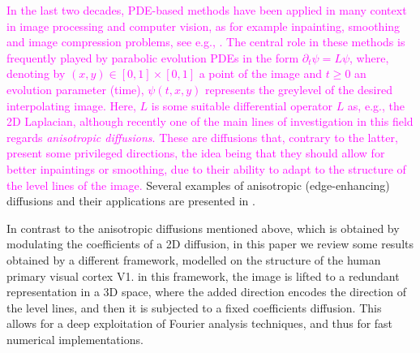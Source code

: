 \documentclass[proc]{edpsmath}
\begin{document}
\textcolor{magenta}{
In the last two decades, PDE-based methods have been applied in many context in image processing and computer vision, as for example inpainting, smoothing and image compression problems, see e.g., \cite{GWWBBS,Tschum,Weickert}. The central role in these methods is frequently played by parabolic evolution PDEs in the form $\partial_t \psi = L\psi$, where, denoting by $(x,y)\in[0,1]\times[0,1]$ a point of the image and $t \ge 0$ an evolution parameter (time), $\psi(t,x,y)$ represents the greylevel of the desired interpolating image. Here, $L$ is some suitable differential operator $L$  as, e.g., the 2D Laplacian, although recently one of the main lines of investigation in this field regards \emph{anisotropic diffusions}. These are diffusions that, contrary to the latter, 
present some privileged directions, the idea being that they should allow for better inpaintings or smoothing, due to their ability to adapt to the structure of the level lines
of the image.
}
Several examples of anisotropic (edge-enhancing) diffusions and their applications
are presented in \cite{GWWBBS,Tschum}.

In contrast to the anisotropic diffusions mentioned above, which is obtained by modulating the coefficients of a 2D diffusion, in this paper we review some results obtained by a different framework, modelled on the structure of the human primary visual cortex V1. in this framework, the image is lifted to a redundant representation in a 3D space, where the added direction encodes the direction of the level lines, and then it is subjected to a fixed coefficients diffusion. This allows for a deep exploitation of Fourier analysis techniques, and thus for fast numerical implementations.
\end{document}
